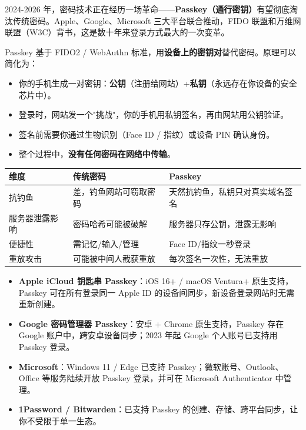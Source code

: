 
2024-2026 年，密码技术正在经历一场革命——\textbf{Passkey（通行密钥）}有望彻底淘汰传统密码。Apple、Google、Microsoft 三大平台联合推动，FIDO 联盟和万维网联盟（W3C）背书，这是数十年来登录方式最大的一次变革。


Passkey 基于 FIDO2 / WebAuthn 标准，用\textbf{设备上的密钥对}替代密码。原理可以简化为：

\begin{itemize}
  \item 你的手机生成一对密钥：\textbf{公钥}（注册给网站）+\textbf{私钥}（永远存在你设备的安全芯片中）。
  \item 登录时，网站发一个"挑战"，你的手机用私钥签名，再由网站用公钥验证。
  \item 签名前需要你通过生物识别（Face ID / 指纹）或设备 PIN 确认身份。
  \item 整个过程中，\textbf{没有任何密码在网络中传输}。
\end{itemize}


\begin{center}
\begin{tabularx}{\linewidth}{|X|X|X|}
\hline
\textbf{维度} & \textbf{传统密码} & \textbf{Passkey} \tabularnewline
\hline
抗钓鱼 & 差，钓鱼网站可窃取密码 & 天然抗钓鱼，私钥只对真实域名签名 \tabularnewline
服务器泄露影响 & 密码哈希可能被破解 & 服务器只存公钥，泄露无影响 \tabularnewline
便捷性 & 需记忆/输入/管理 & Face ID/指纹一秒登录 \tabularnewline
重放攻击 & 可能被中间人截获重放 & 每次签名一次性，无法重放 \tabularnewline
\hline
\end{tabularx}
\end{center}


\begin{itemize}
  \item \textbf{Apple iCloud 钥匙串 Passkey}：iOS 16+ / macOS Ventura+ 原生支持，Passkey 可在所有登录同一 Apple ID 的设备间同步，新设备登录网站时无需重新创建。
  \item \textbf{Google 密码管理器 Passkey}：安卓 + Chrome 原生支持，Passkey 存在 Google 账户中，跨安卓设备同步；2023 年起 Google 个人账号已支持用 Passkey 登录。
  \item \textbf{Microsoft}：Windows 11 / Edge 已支持 Passkey；微软账号、Outlook、Office 等服务陆续开放 Passkey 登录，并可在 Microsoft Authenticator 中管理。
  \item \textbf{1Password / Bitwarden}：已支持 Passkey 的创建、存储、跨平台同步，让你不受限于单一生态。
\end{itemize}

